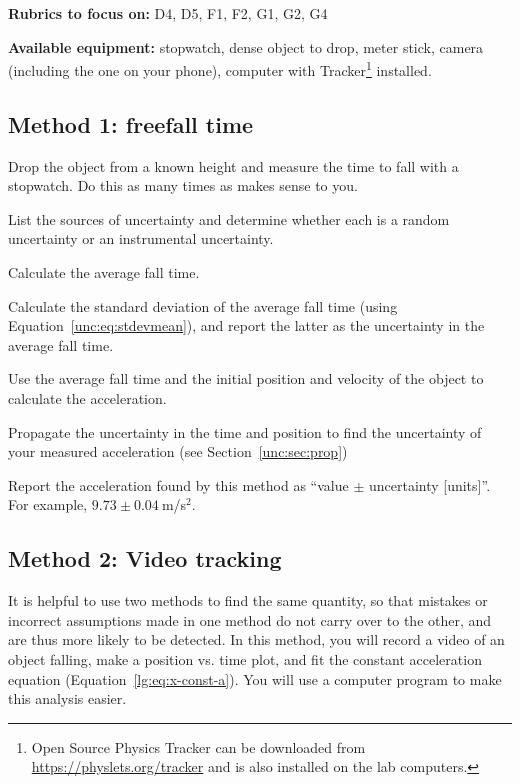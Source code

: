\textbf{Rubrics to focus on:} D4, D5, F1, F2, G1, G2, G4

\textbf{Available equipment:} stopwatch, dense object to drop, meter stick, camera (including the one on your phone), computer with Tracker\footnote{Open Source Physics Tracker can be downloaded from \url{https://physlets.org/tracker} and is also installed on the lab computers.} installed.

\subsection{Method 1: freefall time}

\begin{steps}
	\item Drop the object from a known height and measure the time to fall with a stopwatch. Do this as many times as makes sense to you.
	
	\item List the sources of uncertainty and determine whether each is a random uncertainty or an instrumental uncertainty.
	
	\item Calculate the average fall time.
	
	\item Calculate the standard deviation of the average fall time (using Equation~\ref{unc:eq:stdevmean}), and report the latter as the uncertainty in the average fall time.
	
	\item Use the average fall time and the initial position and velocity of the object to calculate the acceleration.
	
	\item Propagate the uncertainty in the time and position to find the uncertainty of your measured acceleration (see Section~\ref{unc:sec:prop})
	
	\item Report the acceleration found by this method as ``value $\pm$ uncertainty [units]''. For example, $9.73 \pm 0.04\:$m/s$^2$.
\end{steps}

\subsection{Method 2: Video tracking}

It is helpful to use two methods to find the same quantity, so that mistakes or incorrect assumptions made in one method do not carry over to the other, and are thus more likely to be detected. In this method, you will record a video of an object falling, make a position vs. time plot, and fit the constant acceleration equation (Equation~\ref{lg:eq:x-const-a}). You will use a computer program to make this analysis easier.

